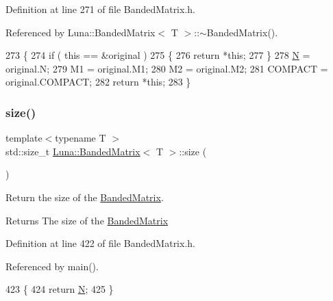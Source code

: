 Definition at line 271 of file Banded\+Matrix.\+h.



Referenced by Luna\+::\+Banded\+Matrix$<$ T $>$\+::$\sim$\+Banded\+Matrix().


\begin{DoxyCode}
273   \{
274     \textcolor{keywordflow}{if} ( \textcolor{keyword}{this} == &original )
275     \{
276       \textcolor{keywordflow}{return} *\textcolor{keyword}{this};
277     \}
278     \hyperlink{namespaceHeat__plot_a7d050092798e28458a263710837bda77}{N} = original.N;
279     M1 = original.M1;
280     M2 = original.M2;
281     COMPACT = original.COMPACT;
282     \textcolor{keywordflow}{return} *\textcolor{keyword}{this};
283   \}
\end{DoxyCode}
\mbox{\label{classLuna_1_1BandedMatrix_a06a7beee72765a353161bd87fa772f2f}} 
\subsubsection{\texorpdfstring{size()}{size()}}
{\footnotesize\ttfamily template$<$typename T $>$ \\
std\+::size\+\_\+t \hyperlink{classLuna_1_1BandedMatrix}{Luna\+::\+Banded\+Matrix}$<$ T $>$\+::size (\begin{DoxyParamCaption}{ }\end{DoxyParamCaption})\hspace{0.3cm}{\ttfamily [inline]}}



Return the size of the \hyperlink{classLuna_1_1BandedMatrix}{Banded\+Matrix}. 

\begin{DoxyReturn}{Returns}
The size of the \hyperlink{classLuna_1_1BandedMatrix}{Banded\+Matrix} 
\end{DoxyReturn}


Definition at line 422 of file Banded\+Matrix.\+h.



Referenced by main().


\begin{DoxyCode}
423   \{
424     \textcolor{keywordflow}{return} \hyperlink{namespaceHeat__plot_a7d050092798e28458a263710837bda77}{N};
425   \}
\end{DoxyCode}
\mbox{\label{classLuna_1_1BandedMatrix_a9cced90755c2d5e467b5c6d6f04e3c59}} 
